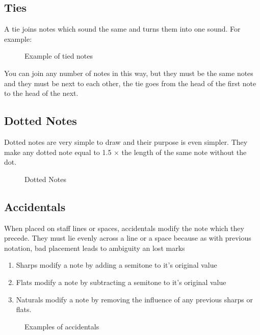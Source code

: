 \subsection* {Ties}

A tie joins notes which sound the same and turns them into one sound. For example:

\begin{figure}[h!]
  \centering
  \caption{Example of tied notes}
  \label{fig:TiedNotes}
\end{figure}

You can join any number of notes in this way, but they must be the same notes and they must be next to each other, the tie goes from the head of the first note to the head of the next.

\subsection*{Dotted Notes}

Dotted notes are very simple to draw and their purpose is even simpler. They make any dotted note equal to 1.5 $\times$ the length of the same note without the dot.

\begin{figure}[h!]
  \centering
  \caption{Dotted Notes}
  \label{fig:DottedNotes}
\end{figure}

\subsection*{Accidentals}

When placed on staff lines or spaces, accidentals modify the note which they precede. They must lie evenly across a line or a space because as with previous notation, bad placement leads to ambiguity an lost marks

\begin{enumerate}
\item Sharps modify a note by adding a semitone to it's original value
\item Flats modify a note by subtracting a semitone to it's original value
\item Naturals modify a note by removing the influence of any previous sharps or flats.
\end{enumerate}

\begin{figure}[h!]
  \centering
  \caption{Examples of accidentals}
  \label{fig:Accidentals}
\end{figure}
